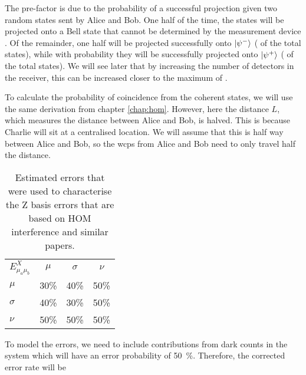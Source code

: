 The  pre-factor is due to the probability of a successful projection given two random states sent by Alice and Bob. One half of the time, the states will be projected onto a Bell state that cannot be determined by the measurement device \cite{walborn2003, Mattle1996}. Of the remainder, one half will be projected successfully onto $\ket{\psi^-}$ ( of the total states), while with probability  they will be successfully projected onto $\ket{\psi^+}$ ( of the total states). We will see later that by increasing the number of detectors in the receiver, this can be increased closer to the maximum of .

To calculate the probability of coincidence from the coherent states, we will use the same derivation from chapter \ref{chap:hom}. However, here the distance $L$, which measures the distance between Alice and Bob, is halved. This is because Charlie will sit at a centralised location. We will assume that this is half way between Alice and Bob, so the \acp{wcp} from Alice and Bob need to only travel half the distance. 

\begin{table}[t]
	\centering
	\begin{tabular}{lccc}
		$E^X_{\mu_a\mu_b}$ & $\mu$ & $\sigma$ & $\nu$ \\
		$\mu$             	& 30\%  	& 40\%                      	& 50\%                      \\
		$\sigma$    		& 40\%  	& 30\%                      	& 50\%                      \\
		$\nu$              	& 50\%  	& 50\%                       	& 50\%                   
	\end{tabular}
	\caption[Table of estimated errors for modelling]{Estimated errors that were used to characterise the Z basis errors that are based on \ac{HOM} interference and similar papers.}
	\label{tab:x-errors}
\end{table}


To model the errors, we need to include contributions from dark counts in the system which will have an error probability of \SI{50}{\percent}. Therefore, the corrected error rate will be

